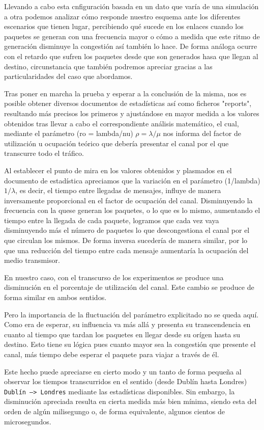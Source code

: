 Llevando a cabo esta cnfiguración basada en un dato que varía de una simulación a otra podemos analizar cómo responde nuestro esquema ante los diferentes escenarios que tienen lugar, percibiendo qué sucede en los enlaces cuando los paquetes se generan con una frecuencia mayor o cómo a medida que este ritmo de generación disminuye la congestión así también lo hace. De forma análoga ocurre con el retardo que sufren los paquetes desde que son generados hasa que llegan al destino, circunstancia que también podremos apreciar gracias a las particularidades del caso que abordamos.

Tras poner en marcha la prueba y esperar a la conclusión de la misma, nos es posible obtener diversos documentos de estadísticas así como ficheros "reports", resultando más precisos los primeros y ajustándose en mayor medida a los valores obtenidos tras llevar a cabo el correspondiente análisis matemático, el cual, mediante el parámetro (ro = lambda/nu) $\rho = \lambda/\mu$ nos informa del factor de utilización u ocupación teórico que debería presentar el canal por el que transcurre todo el tráfico.

Al establecer el punto de mira en los valores obtenidos y plasmados en el documento de estadística apreciamos que la variación en el parámetro (1/lambda) $1/\lambda$, es decir, el tiempo entre llegadas de mensajes, influye de manera inversamente proporcional en el factor de ocupación del canal. Disminuyendo la frecuencia con la quese generan los paquetes, o lo que es lo mismo, aumentando el tiempo entre la llegada de cada paquete, logramos que cada vez vaya disminuyendo más el número de paquetes lo que descongestiona el canal por el que circulan los mismos. De forma inversa sucedería de manera similar, por lo que una reducción del tiempo entre cada mensaje aumentaría la ocupación del medio transmisor.

En nuestro caso, con el transcurso de los experimentos se produce una disminución en el porcentaje de utilización del canal. Este cambio se produce de forma similar en ambos sentidos.

Pero la importancia de la fluctuación del parámetro explicitado no se queda aquí. Como era de esperar, su influencia va más allá y presenta su transcendencia en cuanto al tiempo que tardan los paquetes en llegar desde su orígen hasta su destino. Esto tiene su lógica pues cuanto mayor sea la congestión que presente el canal, más tiempo debe esperar el paquete para viajar a través de él.

Este hecho puede apreciarse en cierto modo y un tanto de forma pequeña al observar los tiempos transcurridos en el sentido (desde Dublín hasta Londres) \texttt{Dublín --> Londres} mediante las estadísticas disponibles. Sin embargo, la disminución apreciada resulta en cierta medida más bien mínima, siendo esta del orden de algún milisegungo o, de forma equivalente, algunos cientos de microsegundos.

